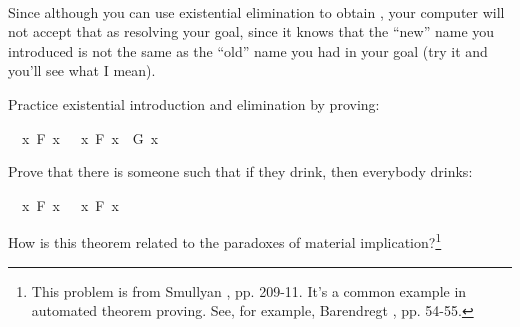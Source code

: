 \begin{isabellebody}
\isadelimproof
\ %
\endisadelimproof
%
\isatagproof
{}\isamarkupfalse%
%
\endisatagproof
{\isafoldproof}%
%
\isadelimproof
%
\endisadelimproof
%
\begin{isamarkuptext}%
Since although you can use existential elimination to obtain , your computer
will not accept that as resolving your goal, since it knows that the ``new'' name you introduced is
not the same as the ``old'' name you had in your goal (try it and you'll see what I mean).%
\end{isamarkuptext}\isamarkuptrue%
%
\begin{isamarkuptext}%
\begin{Exercise} Practice existential introduction and elimination by proving: \end{Exercise}%
\end{isamarkuptext}\isamarkuptrue%
\isamarkupfalse%
\ {\isachardoublequoteopen}{\isacharparenleft}{\isasymexists}\ x{\isachardot}\ F\ x{\isacharparenright}\ {\isasymlongrightarrow}\ {\isacharparenleft}{\isasymexists}\ x{\isachardot}\ F\ x\ {\isasymor}\ G\ x{\isacharparenright}{\isachardoublequoteclose}%
\isadelimproof
\ %
\endisadelimproof
%
\isatagproof
{}\isamarkupfalse%
%
\endisatagproof
{\isafoldproof}%
%
\isadelimproof
%
\endisadelimproof
%
\begin{isamarkuptext}%
\begin{Exercise}[title = {The Drinker Principle}, label = drinker] 
Prove that there is someone such that if they drink, then everybody drinks: \end{Exercise}%
\end{isamarkuptext}\isamarkuptrue%
\isamarkupfalse%
\ {\isachardoublequoteopen}{\isasymexists}\ x{\isachardot}\ F\ x\ {\isasymlongrightarrow}\ {\isacharparenleft}{\isasymforall}\ x{\isachardot}\ F\ x{\isacharparenright}{\isachardoublequoteclose}%
\isadelimproof
\ %
\endisadelimproof
%
\isatagproof
{}\isamarkupfalse%
%
\endisatagproof
{\isafoldproof}%
%
\isadelimproof
%
\endisadelimproof
%
\begin{isamarkuptext}%
How is this theorem related to the paradoxes of material implication?\footnote{This problem
is from Smullyan \cite{smullyan_what_1978}, pp. 209-11. It's a common example in automated theorem
proving. See, for example, Barendregt \cite{barendregt_quest_1996}, pp. 54-55.}%
\end{isamarkuptext}\isamarkuptrue%
%
\isamarkuptrue%
%
\begin{isamarkuptext}%

\end{isamarkuptext}
\end{isabellebody}
